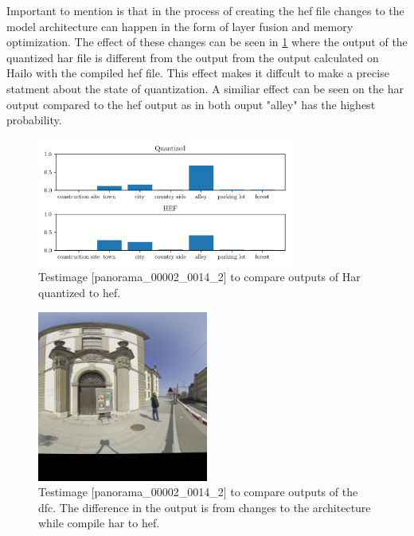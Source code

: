 Important to mention is that in the process of creating the \acrshort{hef} file changes to the model architecture can happen in the form of 
layer fusion and memory optimization.
The effect of these changes can be seen in \cref{methods:fig:comparern50harhef} where the output of the quantized \acrshort{har} file is different from the output from the output calculated on Hailo with the compiled \acrshort{hef} file.
This effect makes it diffcult to make a precise statment about the state of quantization.
A similiar effect can be seen on the \acrshort{har} output compared to the \acrshort{hef} output as in both ouput "alley" has the highest probability.

\begin{figure}
    \centering
    \includegraphics[width=0.75\textwidth]{Images/Implementation/compareProbs_RN50_quant_Hef.png}
    \caption{Testimage [panorama\_00002\_0014\_2] to compare outputs of Har quantized to \acrshort{hef}.}
    \label{methods:fig:comparern50harhef}
\end{figure}

\begin{figure}
    \centering
    \includegraphics[width=0.5\textwidth]{Images/Implementation/panorama_00002_0014_2_testIMg.jpg}
    \caption{Testimage [panorama\_00002\_0014\_2] to compare outputs of the \acrshort{dfc}. The difference in the output is from changes to the architecture while compile \acrshort{har} to \acrshort{hef}.}
    \label{methods:fig:comparetestpic}
\end{figure}



